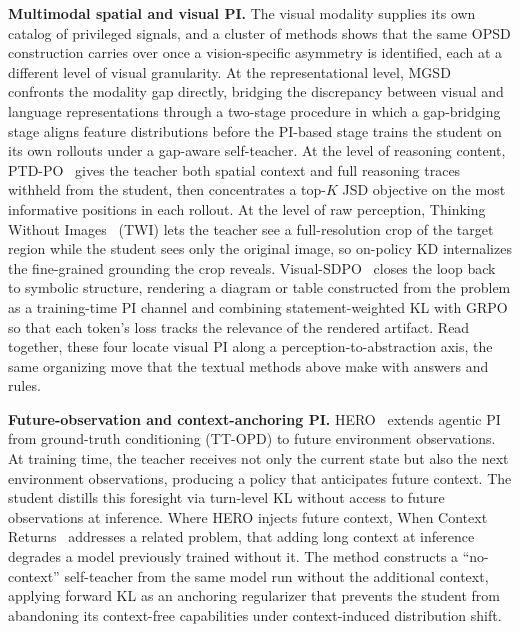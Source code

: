 \documentclass{article} %
\begin{document}
\textbf{Multimodal spatial and visual PI.} The visual modality supplies its own catalog of privileged signals, and a cluster of methods shows that the same OPSD construction carries over once a vision-specific asymmetry is identified, each at a different level of visual granularity. At the representational level, MGSD~\citep{2606.06076} confronts the modality gap directly, bridging the discrepancy between visual and language representations through a two-stage procedure in which a gap-bridging stage aligns feature distributions before the PI-based stage trains the student on its own rollouts under a gap-aware self-teacher. At the level of reasoning content, PTD-PO~\citep{2606.07000} gives the teacher both spatial context and full reasoning traces withheld from the student, then concentrates a top-$K$ JSD objective on the most informative positions in each rollout. At the level of raw perception, Thinking Without Images~\citep{2606.08719} (TWI) lets the teacher see a full-resolution crop of the target region while the student sees only the original image, so on-policy KD internalizes the fine-grained grounding the crop reveals. Visual-SDPO~\citep{2606.10334} closes the loop back to symbolic structure, rendering a diagram or table constructed from the problem as a training-time PI channel and combining statement-weighted KL with GRPO so that each token's loss tracks the relevance of the rendered artifact. Read together, these four locate visual PI along a perception-to-abstraction axis, the same organizing move that the textual methods above make with answers and rules.

\textbf{Future-observation and context-anchoring PI.} HERO~\citep{2606.11559} extends agentic PI from ground-truth conditioning (TT-OPD) to future environment observations. At training time, the teacher receives not only the current state but also the next environment observations, producing a policy that anticipates future context. The student distills this foresight via turn-level KL without access to future observations at inference. Where HERO injects future context, When Context Returns~\citep{2606.11627} addresses a related problem, that adding long context at inference degrades a model previously trained without it. The method constructs a ``no-context'' self-teacher from the same model run without the additional context, applying forward KL as an anchoring regularizer that prevents the student from abandoning its context-free capabilities under context-induced distribution shift.
\end{document}
